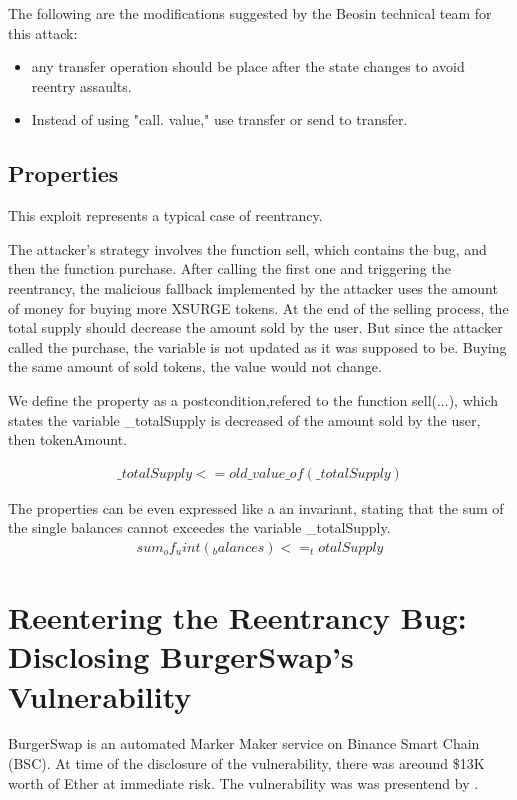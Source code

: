 The following are the modifications suggested by the Beosin technical team for this attack:
\begin{itemize}
    \item any transfer operation should be place after the state changes to avoid reentry assaults.
    \item Instead of using "call. value," use transfer or send to transfer. 
\end{itemize}

\subsection{Properties}

This exploit represents a typical case of reentrancy. 

The attacker's strategy involves the function sell, which contains the bug, and then the function purchase. 
After calling the first one and triggering the reentrancy, the malicious fallback implemented by the attacker uses the amount of money for buying more XSURGE tokens. 
At the end of the selling process, the total supply should decrease the amount sold by the user.
But since the attacker called the purchase, the variable is not updated as it was supposed to be. 
Buying the same amount of sold tokens, the value would not change.

We define the property as a postcondition,refered to the function sell(...), which states the variable \_totalSupply is decreased of the amount sold by the user, then tokenAmount.

\begin{equation}
    \begin{split}
        \_totalSupply <=old\_value\_of(\_totalSupply)
    \end{split}
\end{equation}

The properties can be even expressed like a an invariant, stating that the sum of the single balances cannot exceedes the variable \_totalSupply.
\begin{equation}
    \begin{split}
        sum_of_uint(_balances) <= _totalSupply
    \end{split}
\end{equation}

\section{Reentering the Reentrancy Bug: Disclosing BurgerSwap's Vulnerability}   
\label{sec:Exploits:BurgerSwap}
BurgerSwap is an automated Marker Maker service on Binance Smart Chain (BSC). 
At time of the disclosure of the vulnerability, there was areound \$13K worth of Ether at immediate risk.
The vulnerability was was presentend by \citet{BurgerSwap}.

